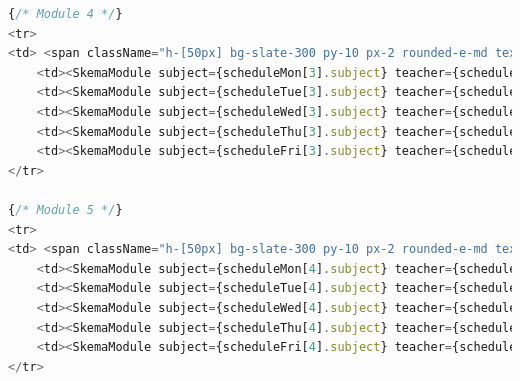 \documentclass[12pt, a4paper]{article}
\begin{document}
\begin{appendices}
\begin{lstlisting}[language=Javascript]
{/* Module 4 */}
<tr>
<td> <span className="h-[50px] bg-slate-300 py-10 px-2 rounded-e-md text-slate-600 font-bold">4.</span> </td>
    <td><SkemaModule subject={scheduleMon[3].subject} teacher={scheduleMon[3].teacher} room={scheduleMon[3].room} visibility={scheduleMon[3].visibility} note={scheduleMon[3].note} homework={scheduleMon[3].homework} id={scheduleMon[3].id} /></td>
    <td><SkemaModule subject={scheduleTue[3].subject} teacher={scheduleTue[3].teacher} room={scheduleTue[3].room} visibility={scheduleTue[3].visibility} note={scheduleTue[3].note} homework={scheduleTue[3].homework} id={scheduleTue[3].id} /></td>
    <td><SkemaModule subject={scheduleWed[3].subject} teacher={scheduleWed[3].teacher} room={scheduleWed[3].room} visibility={scheduleWed[3].visibility} note={scheduleWed[3].note} homework={scheduleWed[3].homework} id={scheduleWed[3].id} /></td>
    <td><SkemaModule subject={scheduleThu[3].subject} teacher={scheduleThu[3].teacher} room={scheduleThu[3].room} visibility={scheduleThu[3].visibility} note={scheduleThu[3].note} homework={scheduleThu[3].homework} id={scheduleThu[3].id} /></td>
    <td><SkemaModule subject={scheduleFri[3].subject} teacher={scheduleFri[3].teacher} room={scheduleFri[3].room} visibility={scheduleFri[3].visibility} note={scheduleFri[3].note} homework={scheduleFri[3].homework} id={scheduleFri[3].id} /></td>
</tr>

{/* Module 5 */}
<tr>
<td> <span className="h-[50px] bg-slate-300 py-10 px-2 rounded-e-md text-slate-600 font-bold">5.</span> </td>
    <td><SkemaModule subject={scheduleMon[4].subject} teacher={scheduleMon[4].teacher} room={scheduleMon[4].room} visibility={scheduleMon[3].visibility} note={scheduleMon[4].note} homework={scheduleMon[4].homework} id={scheduleMon[4].id} /></td>
    <td><SkemaModule subject={scheduleTue[4].subject} teacher={scheduleTue[4].teacher} room={scheduleTue[4].room} visibility={scheduleTue[4].visibility} note={scheduleTue[4].note} homework={scheduleMon[4].homework} id={scheduleTue[4].id} /></td>
    <td><SkemaModule subject={scheduleWed[4].subject} teacher={scheduleWed[4].teacher} room={scheduleWed[4].room} visibility={scheduleWed[4].visibility} note={scheduleWed[4].note} homework={scheduleTue[4].homework} id={scheduleWed[4].id} /></td>
    <td><SkemaModule subject={scheduleThu[4].subject} teacher={scheduleThu[4].teacher} room={scheduleThu[4].room} visibility={scheduleThu[4].visibility} note={scheduleThu[4].note} homework={scheduleWed[4].homework} id={scheduleThu[4].id} /></td>
    <td><SkemaModule subject={scheduleFri[4].subject} teacher={scheduleFri[4].teacher} room={scheduleFri[4].room} visibility={scheduleFri[4].visibility} note={scheduleFri[4].note} homework={scheduleFri[4].homework} id={scheduleFri[4].id} /></td>
</tr>


\end{lstlisting}
\end{appendices}
\end{document}
